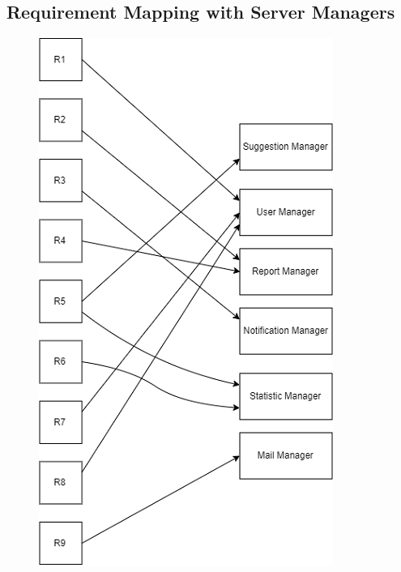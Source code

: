 \subsection{Requirement Mapping with Server Managers}

\begin{figure}[H]
\centering
\includegraphics{Images/ReqMapping.png}
\end{figure}
